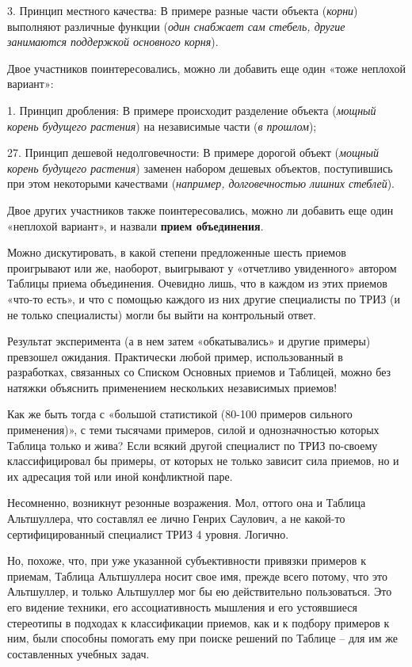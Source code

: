 \documentclass[11pt,a4paper]{article}
\begin{document}
3. Принцип местного качества: В примере разные части объекта (\emph{корни})
выполняют различные функции (\emph{один снабжает сам стебель, другие
  занимаются поддержкой основного корня}).

Двое участников поинтересовались, можно ли добавить еще один «тоже неплохой
вариант»:

1. Принцип дробления: В примере происходит разделение объекта (\emph{мощный
  корень будущего растения}) на независимые части (\emph{в прошлом});

27. Принцип дешевой недолговечности: В примере дорогой объект (\emph{мощный
  корень будущего растения}) заменен набором дешевых объектов, поступившись
при этом некоторыми качествами (\emph{например, долговечностью лишних стеблей}).

Двое других участников также поинтересовались, можно ли добавить еще один
«неплохой вариант», и назвали \textbf{прием объединения}.

Можно дискутировать, в какой степени предложенные шесть приемов проигрывают
или же, наоборот, выигрывают у «отчетливо увиденного» автором Таблицы приема
объединения. Очевидно лишь, что в каждом из этих приемов «что-то есть», и что
с помощью каждого из них другие специалисты по ТРИЗ (и не только специалисты)
могли бы выйти на контрольный ответ.

Результат эксперимента (а в нем затем «обкатывались» и другие примеры)
превзошел ожидания. Практически любой пример, использованный в разработках,
связанных со Списком Основных приемов и Таблицей, можно без натяжки объяснить
применением нескольких независимых приемов!

Как же быть тогда с «большой статистикой (80-100 примеров сильного
применения)», с теми тысячами примеров, силой и однозначностью которых Таблица
только и жива? Если всякий другой специалист по ТРИЗ по-своему классифицировал
бы примеры, от которых не только зависит сила приемов, но и их адресация той
или иной конфликтной паре.

Несомненно, возникнут резонные возражения. Мол, оттого она и Таблица
Альтшуллера, что составлял ее лично Генрих Саулович, а не какой-то
сертифицированный специалист ТРИЗ 4 уровня. Логично.

Но, похоже, что, при уже указанной субъективности привязки примеров к приемам,
Таблица Альтшуллера носит свое имя, прежде всего потому, что это Альтшуллер, и
только Альтшуллер мог бы ею действительно пользоваться. Это его видение
техники, его ассоциативность мышления и его устоявшиеся стереотипы в подходах
к классификации приемов, как и к подбору примеров к ним, были способны
помогать ему при поиске решений по Таблице -- для им же составленных учебных
задач.
\end{document}
